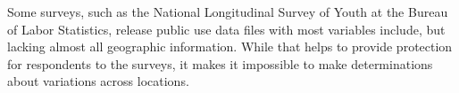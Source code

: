 Some surveys, such as the National Longitudinal Survey of Youth at the Bureau of Labor Statistics, release public use data files with most variables include, but lacking almost all geographic information. While that helps to provide protection for respondents to the surveys, it makes it impossible to make determinations about variations across locations.

